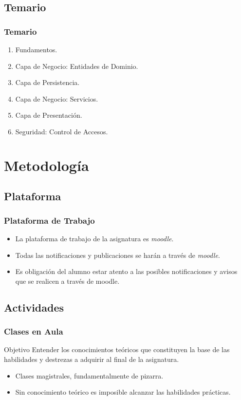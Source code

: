 \documentclass[handout,a4paper,t,xcolor=pst,dvips,colortheme]{beamer}
\begin{document}
\subsection{Temario}

\begin{frame}[c]
	\frametitle{Temario}
	\begin{enumerate}
		\item<1-> Fundamentos.
		\item<2-> Capa de Negocio: Entidades de Dominio.
		\item<3-> Capa de Persistencia.
		\item<4-> Capa de Negocio: Servicios.
		\item<5-> Capa de Presentación.
        \item<6-> Seguridad: Control de Accesos.
	\end{enumerate}
\end{frame}

\section{Metodología}

\subsection{Plataforma}

\begin{frame}[c]
	\frametitle{Plataforma de Trabajo}
	\begin{itemize}
		\item<1-> La plataforma de trabajo de la asignatura es \emph{moodle}.
		\item<2-> Todas las notificaciones y publicaciones se harán a través de \emph{moodle}.
		\item<3-> \alert{Es obligación del alumno estar atento a las posibles notificaciones y avisos que se realicen a través de moodle}.
	\end{itemize}
\end{frame}

\subsection{Actividades}

\begin{frame}
	\frametitle{Clases en Aula}
	\begin{block}{Objetivo}
        Entender los conocimientos teóricos que constituyen la base de las habilidades y destrezas a adquirir al final de la asignatura.
	\end{block}
    \begin{itemize}
        \item<2-> Clases magistrales, fundamentalmente de pizarra.
		\item<3-> Sin conocimiento teórico es imposible alcanzar las habilidades prácticas.
	\end{itemize}
\end{frame}
\end{document}
